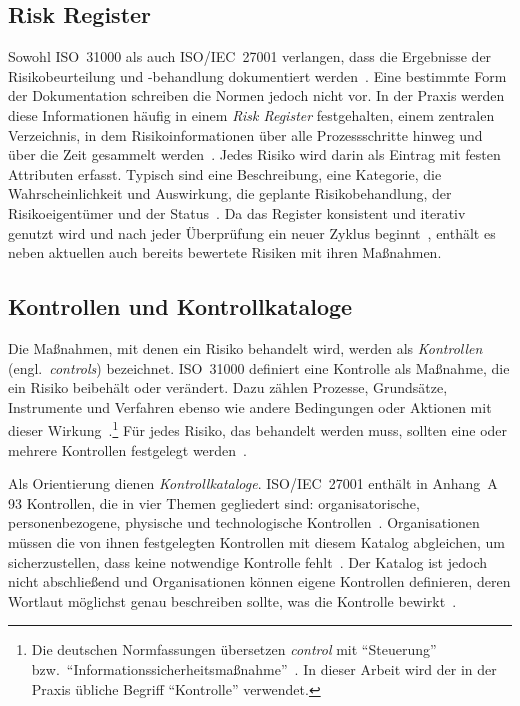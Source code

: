 \subsection{Risk Register}\label{subsec:risk_register}
Sowohl ISO~31000 als auch ISO/IEC~27001 verlangen, dass die Ergebnisse der Risikobeurteilung und -behandlung dokumentiert werden~\cites[S.~23]{iso31000}[S.~10--11]{iso27001}.
Eine bestimmte Form der Dokumentation schreiben die Normen jedoch nicht vor.
In der Praxis werden diese Informationen häufig in einem \emph{Risk Register} festgehalten, einem zentralen Verzeichnis, in dem Risikoinformationen über alle Prozessschritte hinweg und über die Zeit gesammelt werden~\cite[S.~1]{nistir8286}.
Jedes Risiko wird darin als Eintrag mit festen Attributen erfasst.
Typisch sind eine Beschreibung, eine Kategorie, die Wahrscheinlichkeit und Auswirkung, die geplante Risikobehandlung, der Risikoeigentümer und der Status~\cite[S.~12--13]{nistir8286}.
Da das Register konsistent und iterativ genutzt wird und nach jeder Überprüfung ein neuer Zyklus beginnt~\cites[S.~13]{nistir8286}[S.~48]{iso27005}, enthält es neben aktuellen auch bereits bewertete Risiken mit ihren Maßnahmen.

\subsection{Kontrollen und Kontrollkataloge}\label{subsec:kontrollen}
Die Maßnahmen, mit denen ein Risiko behandelt wird, werden als \emph{Kontrollen} (engl.~\emph{controls}) bezeichnet.
ISO~31000 definiert eine Kontrolle als Maßnahme, die ein Risiko beibehält oder verändert.
Dazu zählen Prozesse, Grundsätze, Instrumente und Verfahren ebenso wie andere Bedingungen oder Aktionen mit dieser Wirkung~\cite[S.~9]{iso31000}.\footnote{Die deutschen Normfassungen übersetzen \emph{control} mit \enquote{Steuerung} bzw.~\enquote{Informationssicherheitsmaßnahme}~\cites[S.~9]{iso31000}[S.~18]{iso27001}. In dieser Arbeit wird der in der Praxis übliche Begriff \enquote{Kontrolle} verwendet.}
Für jedes Risiko, das behandelt werden muss, sollten eine oder mehrere Kontrollen festgelegt werden~\cite[S.~35]{iso27005}.

Als Orientierung dienen \emph{Kontrollkataloge}.
ISO/IEC~27001 enthält in Anhang~A 93 Kontrollen, die in vier Themen gegliedert sind: organisatorische, personenbezogene, physische und technologische Kontrollen~\cite[S.~18--26]{iso27001}.
Organisationen müssen die von ihnen festgelegten Kontrollen mit diesem Katalog abgleichen, um sicherzustellen, dass keine notwendige Kontrolle fehlt~\cite[S.~11]{iso27001}.
Der Katalog ist jedoch nicht abschließend und Organisationen können eigene Kontrollen definieren, deren Wortlaut möglichst genau beschreiben sollte, was die Kontrolle bewirkt~\cites[S.~11]{iso27001}[S.~35]{iso27005}.


